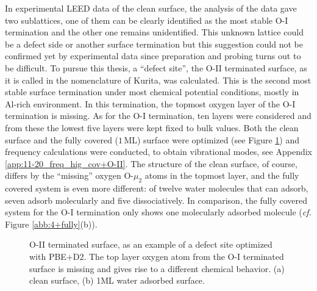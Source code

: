 \documentclass[11pt,DIV=13,BCOR=5mm,a4paper,headinclude]{scrbook}
\begin{document}
In experimental LEED data of the clean surface, the analysis of the data gave two sublattices, one of them can be clearly identified as the most stable O-I termination and the other one remains unidentified.
This unknown lattice could be a defect side or another surface termination but this suggestion could not be confirmed yet by experimental data since preparation and probing turns out to be difficult.
To pursue this thesis, a ``defect site'', the O-II terminated surface, as it is called in the nomenclature of Kurita\cite{kuri10}, was calculated.
This is the second most stable surface termination under most chemical potential conditions, mostly in Al-rich environment.
In this termination, the topmost oxygen layer of the O-I termination is missing.
As for the O-I termination, ten layers were considered and from these the lowest five layers were kept fixed to bulk values.
Both the clean surface and the fully covered ($1\,$ML) surface were optimized (see Figure \ref{abb:O-II-geom}) and frequency calculations were conducted, to obtain vibrational modes, see Appendix \ref{app:11-20_freq_hig_cov+O-II}.
The structure of the clean surface, of course, differs by the ``missing'' oxygen O-$\mu_2$ atoms in the topmost layer, and the fully covered system is even more different: of twelve water molecules that can adsorb, seven adsorb molecularly and five dissociatively.
In comparison, the fully covered system for the O-I termination only shows one molecularly adsorbed molecule (\textit{cf.} Figure \ref{abb:4+fully}(b)).
 \begin{figure}[!ht]
 \centering
{}
 \quad\quad
 \caption{O-II terminated surface, as an example of a defect site optimized with PBE+D2.
The top layer oxygen atom from the O-I terminated surface is missing and gives rise to a different chemical behavior.
(a) clean surface, (b) 1ML water adsorbed surface.}
        \label{abb:O-II-geom}
 \end{figure}
\end{document}

